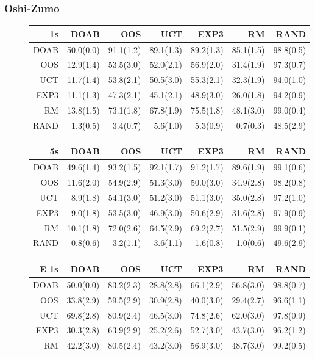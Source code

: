 \subsubsection{Oshi-Zumo}
\begin{figure}[t!]
\centering
\begin{scriptsize}
\begin{tabular}{|r|rrrrrr|}\hline
1s&DOAB&OOS&UCT&EXP3&RM&RAND\\\hline
DOAB&50.0(0.0)&91.1(1.2)&89.1(1.3)&89.2(1.3)&85.1(1.5)&98.8(0.5)\\
OOS&12.9(1.4)&53.5(3.0)&52.0(2.1)&56.9(2.0)&31.4(1.9)&97.3(0.7)\\
UCT&11.7(1.4)&53.8(2.1)&50.5(3.0)&55.3(2.1)&32.3(1.9)&94.0(1.0)\\
EXP3&11.1(1.3)&47.3(2.1)&45.1(2.1)&48.9(3.0)&26.0(1.8)&94.2(0.9)\\
RM&13.8(1.5)&73.1(1.8)&67.8(1.9)&75.5(1.8)&48.1(3.0)&99.0(0.4)\\
RAND&1.3(0.5)&3.4(0.7)&5.6(1.0)&5.3(0.9)&0.7(0.3)&48.5(2.9)\\
\hline
\end{tabular}
\begin{tabular}{|r|rrrrrr|}\hline
5s&DOAB&OOS&UCT&EXP3&RM&RAND\\\hline
DOAB&49.6(1.4)&93.2(1.5)&92.1(1.7)&91.2(1.7)&89.6(1.9)&99.1(0.6)\\
OOS&11.6(2.0)&54.9(2.9)&51.3(3.0)&50.0(3.0)&34.9(2.8)&98.2(0.8)\\
UCT&8.9(1.8)&54.1(3.0)&51.2(3.0)&51.1(3.0)&35.0(2.8)&97.2(1.0)\\
EXP3&9.0(1.8)&53.5(3.0)&46.9(3.0)&50.6(2.9)&31.6(2.8)&97.9(0.9)\\
RM&10.1(1.8)&72.0(2.6)&64.5(2.9)&69.2(2.7)&51.5(2.9)&99.9(0.1)\\
RAND&0.8(0.6)&3.2(1.1)&3.6(1.1)&1.6(0.8)&1.0(0.6)&49.6(2.9)\\
\hline
\end{tabular}
\begin{tabular}{|r|rrrrrr|}\hline
E 1s&DOAB&OOS&UCT&EXP3&RM&RAND\\\hline
DOAB&50.0(0.0)&83.2(2.3)&28.8(2.8)&66.1(2.9)&56.8(3.0)&98.8(0.7)\\
OOS&33.8(2.9)&59.5(2.9)&30.9(2.8)&40.0(3.0)&29.4(2.7)&96.6(1.1)\\
UCT&69.8(2.8)&80.9(2.4)&46.5(3.0)&74.8(2.6)&62.0(3.0)&97.8(0.9)\\
EXP3&30.3(2.8)&63.9(2.9)&25.2(2.6)&52.7(3.0)&43.7(3.0)&96.2(1.2)\\
RM&42.2(3.0)&80.5(2.4)&43.2(3.0)&56.9(3.0)&48.7(3.0)&99.2(0.5)\\

\end{tabular}
\end{scriptsize}
\end{figure}
